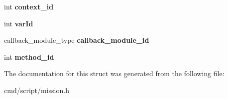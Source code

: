 \begin{DoxyCompactItemize}
\item 
int {\bfseries context\+\_\+id}\hypertarget{structmissionNode_1_1script__t_abd2e22c99f3131540ee17ef802f275d2}{}\label{structmissionNode_1_1script__t_abd2e22c99f3131540ee17ef802f275d2}

\item 
int {\bfseries var\+Id}\hypertarget{structmissionNode_1_1script__t_a47f4f1ab56ac0c9b87c0dbee117db9b1}{}\label{structmissionNode_1_1script__t_a47f4f1ab56ac0c9b87c0dbee117db9b1}

\item 
callback\+\_\+module\+\_\+type {\bfseries callback\+\_\+module\+\_\+id}\hypertarget{structmissionNode_1_1script__t_a42e997676f862104ba80213744845af1}{}\label{structmissionNode_1_1script__t_a42e997676f862104ba80213744845af1}

\item 
int {\bfseries method\+\_\+id}\hypertarget{structmissionNode_1_1script__t_ae4b2c256341aaad226e82337b8d917b6}{}\label{structmissionNode_1_1script__t_ae4b2c256341aaad226e82337b8d917b6}

\end{DoxyCompactItemize}


The documentation for this struct was generated from the following file\+:\begin{DoxyCompactItemize}
\item 
cmd/script/mission.\+h\end{DoxyCompactItemize}
